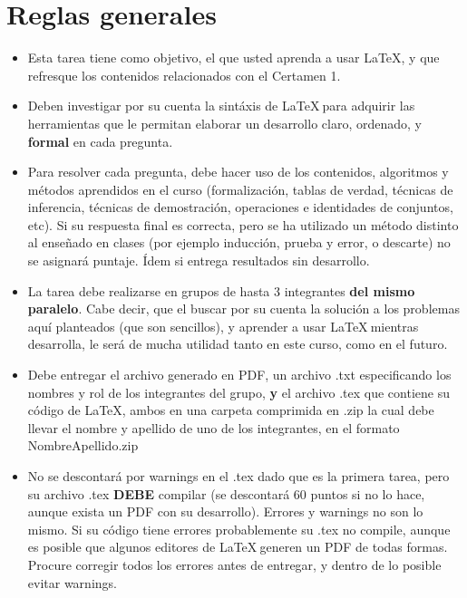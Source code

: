 \documentclass[letterpaper,10pt]{article}
\begin{document}
\section{Reglas generales}
\begin{itemize}
    \item Esta tarea tiene como objetivo, el que usted aprenda a usar \LaTeX, y que refresque los contenidos relacionados con el Certamen 1. 
    \item Deben investigar por su cuenta la sintáxis de \LaTeX $~$para adquirir las herramientas que le permitan elaborar un desarrollo claro, ordenado, y \textbf{formal} en cada pregunta.
    
    \item Para resolver cada pregunta, debe hacer uso de los contenidos, algoritmos y métodos aprendidos en el curso (formalización, tablas de verdad, técnicas de inferencia, técnicas de demostración, operaciones e identidades de conjuntos, etc). Si su respuesta final es correcta, pero se ha utilizado un método distinto al enseñado en clases (por ejemplo inducción, prueba y error, o descarte) no se asignará puntaje. Ídem si entrega resultados sin desarrollo.
    
    \item La tarea debe realizarse en grupos de hasta 3 integrantes \textbf{del mismo paralelo}. Cabe decir, que el buscar por su cuenta la solución a los problemas aquí planteados (que son sencillos), y aprender a usar \LaTeX  $~$mientras desarrolla, le será de mucha utilidad tanto en este curso, como en el futuro.
    
    \item Debe entregar el archivo generado en PDF, un archivo .txt especificando los nombres y rol de los integrantes del grupo, \textbf{y} el archivo .tex que contiene su código de \LaTeX, ambos en una carpeta comprimida en .zip la cual debe llevar el nombre y apellido de uno de los integrantes, en el formato Nombre\textunderscore Apellido.zip
    
    \item No se descontará por warnings en el .tex dado que es la primera tarea, pero su archivo .tex \textbf{DEBE} compilar (se descontará 60 puntos si no lo hace, aunque exista un PDF con su desarrollo). Errores y warnings no son lo mismo. Si su código tiene errores probablemente su .tex no compile, aunque es posible que algunos editores de \LaTeX $~$generen un PDF de todas formas. Procure corregir todos los errores antes de entregar, y dentro de lo posible evitar warnings.
    

\end{itemize}
\end{document}
